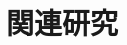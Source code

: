 \documentclass[submit,techreq]{ipsj}
\begin{document}
%
%
%
%
%
%
%
%
%
%
%
%
%
%
%
%
%
%


\section{関連研究}
\end{document}
